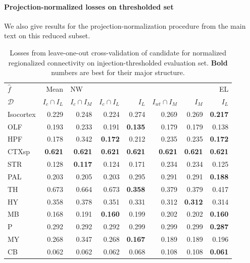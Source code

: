 \newpage
\paragraph{Projection-normalized losses on thresholded set}

We also give results for the projection-normalization procedure from the main text on this reduced subset.

\begin{table}[H]
\begin{tabular}{lrrrrrrr}
\toprule
$\widehat f$ &           Mean & \multicolumn{5}{l}{NW} &     EL \\
$\mathcal D$ & $I_c \cap I_L$ & $I_c \cap I_M$ & $I_c \cap I_L$ &  $I_L$ & $I_{wt} \cap I_M$ &  $I_M$ &  $I_L$ \\
\midrule
Isocortex &          0.229 &          0.248 &          0.224 &  0.274 &             0.269 &  0.269 &  \textbf{0.217} \\
OLF       &          0.193 &          0.233 &          0.191 &   \textbf{0.135} &             0.179 &  0.179 &  0.138 \\
HPF       &          0.178 &          0.342 &          \textbf{ 0.172 }&  0.212 &             0.235 &  0.235 &   \textbf{0.172} \\
CTXsp     &          \textbf{ 0.621 }&      \textbf{     0.621 }&       \textbf{    0.621} &   \textbf{0.621 }&            \textbf{  0.621} &   \textbf{0.621 }&   \textbf{0.621 }\\
STR       &          0.128 &         \textbf{  0.117} &          0.124 &  0.171 &             0.234 &  0.234 &  0.125 \\
PAL       &          0.203 &          0.205 &          0.203 &  0.295 &             0.291 &  0.291 & \textbf{  0.188 }\\
TH        &          0.673 &          0.664 &          0.673 &   \textbf{0.358} &             0.379 &  0.379 &  0.417 \\
HY        &          0.358 &          0.378 &          0.351 &  0.331 &             0.312 &   \textbf{0.312} &  0.314 \\
MB        &          0.168 &          0.191 &         \textbf{ 0.160 }&  0.199 &             0.202 &  0.202 & \textbf{ 0.160} \\
P         &          0.292 &          0.292 &          0.292 &  0.299 &             0.299 &  0.299 &\textbf{  0.287 }\\
MY        &          0.268 &          0.347 &          0.268 &  \textbf{0.167} &             0.189 &  0.189 &  0.196 \\
CB        &          0.062 &          0.062 &          0.062 &  0.068 &             0.108 &  0.108 &  \textbf{0.061 }\\
\bottomrule
\end{tabular}
\caption{Losses from leave-one-out cross-validation of candidate for normalized regionalized connectivity on injection-thresholded evaluation set. \textbf{Bold} numbers are best for their major structure.}
\label{tab:crossvalidation}
\end{table}

